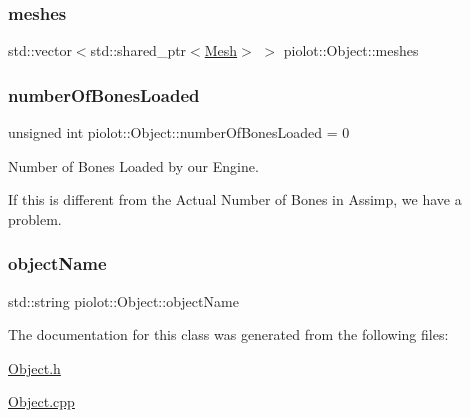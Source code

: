 \mbox{\label{classpiolot_1_1_object_a4a26c60e9239d03e7c31a243c0325934}} 
\subsubsection{\texorpdfstring{meshes}{meshes}}
{\footnotesize\ttfamily std\+::vector$<$std\+::shared\+\_\+ptr$<$\mbox{\hyperlink{classpiolot_1_1_mesh}{Mesh}}$>$ $>$ piolot\+::\+Object\+::meshes\hspace{0.3cm}{\ttfamily [protected]}}

\mbox{\label{classpiolot_1_1_object_ad0a2a51c6614bfb552ee12801643ece2}} 
\subsubsection{\texorpdfstring{number\+Of\+Bones\+Loaded}{numberOfBonesLoaded}}
{\footnotesize\ttfamily unsigned int piolot\+::\+Object\+::number\+Of\+Bones\+Loaded = 0\hspace{0.3cm}{\ttfamily [protected]}}



Number of Bones Loaded by our Engine. 

If this is different from the Actual Number of Bones in Assimp, we have a problem. \mbox{\label{classpiolot_1_1_object_a1995f97bb181bf6aeee850052c01dd24}} 
\subsubsection{\texorpdfstring{object\+Name}{objectName}}
{\footnotesize\ttfamily std\+::string piolot\+::\+Object\+::object\+Name\hspace{0.3cm}{\ttfamily [protected]}}



The documentation for this class was generated from the following files\+:\begin{DoxyCompactItemize}
\item 
\mbox{\hyperlink{_object_8h}{Object.\+h}}\item 
\mbox{\hyperlink{_object_8cpp}{Object.\+cpp}}\end{DoxyCompactItemize}
